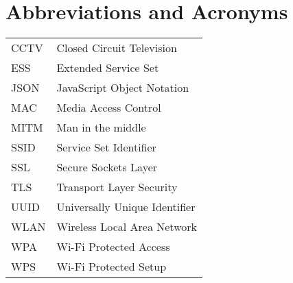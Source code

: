 \chapter*{Abbreviations and Acronyms}


\noindent
\begin{longtable}{@{}p{}p{}@{}}
CCTV & Closed Circuit Television \\
ESS & Extended Service Set \\
JSON & JavaScript Object Notation \\
MAC & Media Access Control \\
MITM & Man in the middle \\
SSID & Service Set Identifier \\
SSL & Secure Sockets Layer \\
TLS & Transport Layer Security \\
UUID & Universally Unique Identifier \\
WLAN & Wireless Local Area Network \\
WPA & Wi-Fi Protected Access \\
WPS & Wi-Fi Protected Setup \\
\end{longtable}
